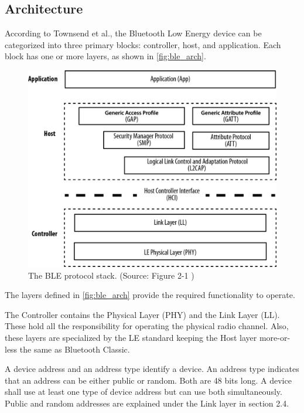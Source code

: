\subsection{Architecture}
\label{ble:ow}

According to Townsend et al., the Bluetooth Low Energy device can be categorized into
three primary blocks: controller, host, and application.
Each block has one or more layers, as shown in \autoref{fig:ble_arch}.

\begin{figure}[!ht]
    \centering
    \includegraphics[width=150mm, keepaspectratio]{figures/ble_arch_from_townsend.png}
    \caption{The BLE protocol stack. (Source: Figure 2-1 \cite{Townsend14})}
    \label{fig:ble_arch}
\end{figure}

The layers defined in \autoref{fig:ble_arch} provide the required functionality to operate.

The Controller contains the Physical Layer (PHY) and the Link Layer (LL).
These hold all the responsibility for operating the physical radio channel. 
Also, these layers are specialized by the LE standard keeping the Host
layer more-or-less the same as Bluetooth Classic.


A device address and an address type identify a device.
An address type indicates that an address can be either public or random.
Both are 48 bits long.
A device shall use at least one type of device address but can use
both simultaneously.
Public and random addresses are explained under the Link layer in section 2.4.


